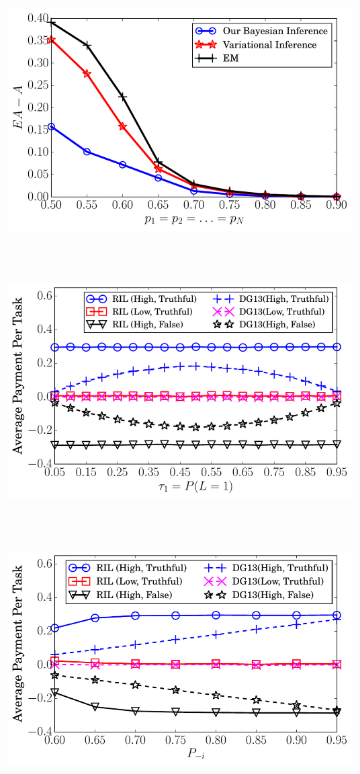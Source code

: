 \documentclass{article}
\begin{document}
\begin{figure}[t]
    \centering
        \begin{subfigure}[t]{0.24\textwidth}
        \centering
        \includegraphics[width=\textwidth]{image/EXPC1}
        \caption{\label{BIM1}}
    \end{subfigure}
    ~
    \begin{subfigure}[t]{0.24\textwidth}
        \centering
        \includegraphics[width=\textwidth]{image/BPP1}
        \caption{\label{BIM2}}
    \end{subfigure}%
    ~
    \begin{subfigure}[t]{0.24\textwidth}
        \centering
        \includegraphics[width=\textwidth]{image/BPP2}

\end{subfigure}
\end{figure}
\end{document}

